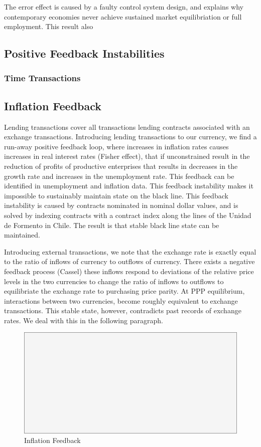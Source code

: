 The error effect is caused by a faulty control system design, and explains why contemporary
economies never achieve sustained market equilibriation or full employment. This result also

\subsection{Positive Feedback Instabilities}

\subsubsection{Time Transactions}

\subsection{Inflation Feedback}

Lending transactions cover all transactions lending contracts associated with an exchange
transactions. Introducing lending transactions to our currency, we find a run-away positive feedback
loop, where increases in inflation rates causes increases in real interest rates (Fisher effect),
that if unconstrained result in the reduction of profits of productive enterprises that results in
decreases in the growth rate and increases in the unemployment rate. This feedback can be identified
in unemployment and inflation data. This feedback instability makes it impossible to sustainably
maintain state on the black line. This feedback instability is caused by contracts nominated in
nominal dollar values, and is solved by indexing contracts with a contract index along the lines of
the Unidad de Formento in Chile. The result is that stable black line state can be maintained.

Introducing external transactions, we note that the exchange rate is exactly equal to the ratio of
inflows of currency to outflows of currency. There exists a negative feedback process (Cassel) these
inflows respond to deviations of the relative price levels in the two currencies to change the ratio
of inflows to outflows to equilibriate the exchange rate to purchasing price parity. At PPP
equilibrium, interactions between two currencies, become roughly equivalent to exchange
transactions. This stable state, however, contradicts past records of exchange rates. We deal with
this in the following paragraph.

\begin{figure}[H]
\centering
\includegraphics[scale=0.48]{blank}
\caption{Inflation Feedback}
\label{fig:inflation_feedback}
\end{figure}


